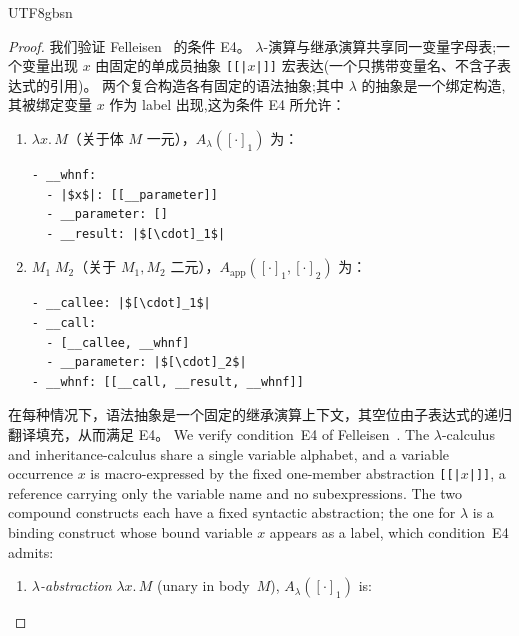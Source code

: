 \begin{CJK*}{UTF8}{gbsn}
\begin{proof}
  \ifPaperChinese
  我们验证 Felleisen~\cite[Definition~3.11]{felleisen1991-expressive-power} 的条件 E4。
  $\lambda$-演算与继承演算共享同一变量字母表;一个变量出现 $x$ 由固定的单成员抽象 \texttt{[[|$x$|]]} 宏表达(一个只携带变量名、不含子表达式的引用)。
  两个复合构造各有固定的语法抽象;其中 $\lambda$ 的抽象是一个绑定构造,其被绑定变量 $x$ 作为 label 出现,这为条件 E4 所允许：
  \begin{enumerate}
    \item \emph{} $\lambda x.\, M$（关于体 $M$ 一元），$A_\lambda([\cdot]_1)$ 为：
      \begin{verbatim}
- __whnf:
  - |$x$|: [[__parameter]]
  - __parameter: []
  - __result: |$[\cdot]_1$|
      \end{verbatim}
    \item \emph{} $M_1\; M_2$（关于 $M_1, M_2$ 二元），$A_{\text{app}}([\cdot]_1, [\cdot]_2)$ 为：
      \begin{verbatim}
- __callee: |$[\cdot]_1$|
- __call:
  - [__callee, __whnf]
  - __parameter: |$[\cdot]_2$|
- __whnf: [[__call, __result, __whnf]]
      \end{verbatim}
  \end{enumerate}
  在每种情况下，语法抽象是一个固定的继承演算上下文，其空位由子表达式的递归翻译填充，从而满足 E4。
  \else
  We verify condition~E4 of
  Felleisen~\cite[Definition~3.11]{felleisen1991-expressive-power}.
  The $\lambda$-calculus and inheritance-calculus share a single variable
  alphabet, and a variable occurrence $x$ is macro-expressed by the fixed
  one-member abstraction \texttt{[[|$x$|]]}, a reference
  carrying only the variable name and no subexpressions.
  The two compound constructs each have a fixed syntactic abstraction; the one
  for $\lambda$ is a binding construct whose bound variable $x$ appears as a
  label, which condition~E4 admits:
  \begin{enumerate}
    \item \emph{$\lambda$-abstraction} $\lambda x.\, M$ (unary in body~$M$), $A_\lambda([\cdot]_1)$ is:

\end{enumerate}
\end{proof}
\end{CJK*}
